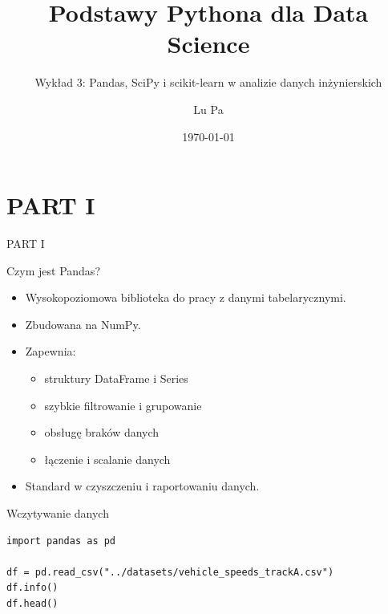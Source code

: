 \documentclass[aspectratio=169]{beamer}
\title{Podstawy Pythona dla Data Science}
\subtitle{Wykład 3: Pandas, SciPy i scikit-learn w analizie danych inżynierskich}
\author{Lu Pa}
\date{\today}
\begin{document}
\begin{frame}
  \titlepage
\end{frame}

\section{PART I}
\begin{frame}[plain]
  \begin{center}
    \vspace{2cm}
    {\color{white}\Huge PART I}
  \end{center}
\end{frame}

\begin{frame}{Czym jest Pandas?}
  \begin{itemize}
    \item Wysokopoziomowa biblioteka do pracy z danymi tabelarycznymi.
    \item Zbudowana na NumPy.
    \item Zapewnia:
      \begin{itemize}
        \item struktury DataFrame i Series
        \item szybkie filtrowanie i grupowanie
        \item obsługę braków danych
        \item łączenie i scalanie danych
      \end{itemize}
    \item Standard w czyszczeniu i raportowaniu danych.
  \end{itemize}
\end{frame}

\begin{frame}[fragile]{Wczytywanie danych}
\begin{verbatim}
import pandas as pd

df = pd.read_csv("../datasets/vehicle_speeds_trackA.csv")
df.info()
df.head()
\end{verbatim}
\end{frame}
\end{document}
